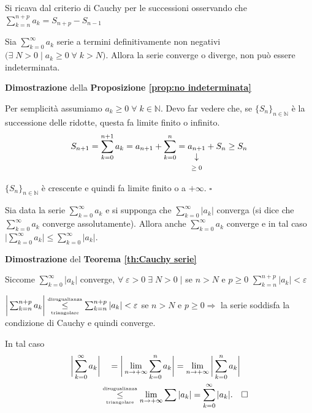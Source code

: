 {\noindent Si ricava dal criterio di Cauchy per le successioni osservando che $\sum_{k=n}^{n+p} a_k = S_{n+p} - S_{n-1}$ \par}

\begin{proposition}
	\label{prop:no indeterminata}
	Sia $\sum_{k=0}^\infty a_k$ serie a termini definitivamente non negativi $\mathrm{(} \exists \; N>0 \; | \; a_k\geq 0 \; \forall \; k>N \mathrm{)}$. Allora la serie converge o diverge, non può essere indeterminata. 
\end{proposition}

\begin{dembar}
	\textbf{Dimostrazione} della \textbf{Proposizione \ref{prop:no indeterminata}}
	
	Per semplicità assumiamo $a_k \geq 0 \; \forall \; k\in\mathbb{N}$. Devo far vedere che, se $\{S_n \}_{n\in\mathbb{N}}$ è la successione delle ridotte, questa fa limite finito o infinito.
	\begin{equation*}
		S_{n+1} = \sum_{k=0}^{n+1} a_k = a_{n+1} + \sum_{k=0}^n = \vertarrowbox{a_{n+1}}{$\geq 0$} + S_n \geq S_n
	\end{equation*}
	
	$\{S_n \}_{n\in\mathbb{N}}$ è crescente e quindi fa limite finito o a $+\infty$. \quad $\square$
\end{dembar}

\begin{theorem}
	\label{th:convergenza assoluta}
	Sia data la serie $\sum_{k=0}^\infty a_k$ e si supponga che $\sum_{k=0}^\infty |a_k|$ converga (si dice che $\sum_{k=0}^\infty a_k$ converge assolutamente). Allora anche $\sum_{k=0}^\infty a_k$ converge e in tal caso $\bigg| \sum_{k=0}^\infty a_k \biggr| \leq \sum_{k=0}^\infty |a_k|$.
\end{theorem}

\begin{dembar}
	\textbf{Dimostrazione} del \textbf{Teorema \ref{th:Cauchy serie}}
	
	Siccome $\sum_{k=0}^\infty |a_k|$ converge, $\forall \; \varepsilon>0 \; \exists \; N>0 \; | $ se $n>N$ e $p\geq 0$ \quad $\sum_{k=n}^{n+p} |a_k| < \varepsilon$
	
	$\bigg| \sum_{k=n}^{n+p} a_k \bigg| \underset{\mbox{\tiny{triangolare}}}{\stackrel{\mbox{\tiny{disugualianza}}}{\leq}} \sum_{k=n}^{n+p} |a_k| < \varepsilon$ se $n>N$ e $p\geq0 \Rightarrow$ la serie soddisfa la condizione di Cauchy e quindi converge.
	
	In tal caso 
	\begin{align*}
		\bigg| \sum_{k=0}^\infty a_k \bigg|
		& \quad = \bigg|\lim_{n\rightarrow+\infty} \sum_{k=0}^n a_k \bigg| = \lim_{n\rightarrow+\infty} \bigg| \sum_{k=0}^n a_k \bigg| \\
		&\underset{\mbox{\tiny{triangolare}}}{\stackrel{\mbox{\tiny{disugualianza}}}{\leq}} \lim_{n\rightarrow+\infty} \sum |a_k| = \sum_{k=0}^\infty |a_k|. \quad \square
	\end{align*}
\end{dembar}

